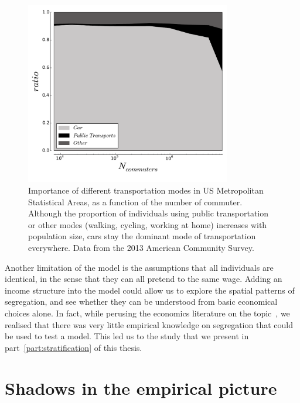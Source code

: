 \begin{figure}[!h]
    \centering
    \includegraphics[width=0.8\textwidth]{gfx/chapter-monocentric/transportation_modes.pdf}
    \caption{Importance of different transportation modes in US Metropolitan
    Statistical Areas, as a function of the number of commuter. Although the
proportion of individuals using public transportation or other modes (walking,
cycling, working at home) increases with population size, cars stay the dominant
mode of transportation everywhere. Data from the 2013 American Community
Survey.\label{fig:transportation_mode}}
\end{figure}


Another limitation of the model is the assumptions that all individuals are
identical, in the sense that they can all pretend to the same wage. Adding an
income structure into the model could allow us to explore the spatial patterns
of segregation, and see whether they can be understood from basic economical
choices alone. In fact, while perusing the economics literature on the
topic~\cite{Glaeser:2008, Brueckner:1999}, we realised that there was very little
empirical knowledge on segregation that could be used to test a model. This led
us to the study that we present in part~\ref{part:stratification} of this
thesis.\\

\medskip

\section{Shadows in the empirical picture}
\label{sec:empirical}

